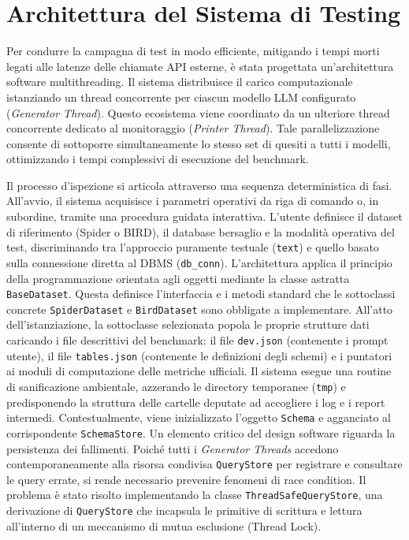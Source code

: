 \section{Architettura del Sistema di
Testing}\label{architettura-del-sistema-di-testing}

Per condurre la campagna di test in modo efficiente, mitigando i tempi
morti legati alle latenze delle chiamate API esterne, è stata progettata
un'architettura software multithreading. Il sistema distribuisce il
carico computazionale istanziando un thread concorrente per ciascun
modello LLM configurato (\emph{Generator Thread}). Questo ecosistema
viene coordinato da un ulteriore thread concorrente dedicato al
monitoraggio (\emph{Printer Thread}). Tale parallelizzazione consente di
sottoporre simultaneamente lo stesso set di quesiti a tutti i modelli,
ottimizzando i tempi complessivi di esecuzione del benchmark.

Il processo d'ispezione si articola attraverso una sequenza
deterministica di fasi. All'avvio, il sistema acquisisce i parametri
operativi da riga di comando o, in subordine, tramite una procedura
guidata interattiva. L'utente definisce il dataset di riferimento
(Spider o BIRD), il database bersaglio e la modalità operativa del test,
discriminando tra l'approccio puramente testuale (\texttt{text}) e
quello basato sulla connessione diretta al DBMS (\texttt{db\_conn}).
L'architettura applica il principio della programmazione orientata agli
oggetti mediante la classe astratta \texttt{BaseDataset}. Questa
definisce l'interfaccia e i metodi standard che le sottoclassi concrete
\texttt{SpiderDataset} e \texttt{BirdDataset} sono obbligate a
implementare. All'atto dell'istanziazione, la sottoclasse selezionata
popola le proprie strutture dati caricando i file descrittivi del
benchmark: il file \texttt{dev.json} (contenente i prompt utente), il
file \texttt{tables.json} (contenente le definizioni degli schemi) e i
puntatori ai moduli di computazione delle metriche ufficiali. Il sistema
esegue una routine di sanificazione ambientale, azzerando le directory
temporanee (\texttt{tmp}) e predisponendo la struttura delle cartelle
deputate ad accogliere i log e i report intermedi. Contestualmente,
viene inizializzato l'oggetto \texttt{Schema} e agganciato al
corrispondente \texttt{SchemaStore}. Un elemento critico del design
software riguarda la persistenza dei fallimenti. Poiché tutti i
\emph{Generator Threads} accedono contemporaneamente alla risorsa
condivisa \texttt{QueryStore} per registrare e consultare le query
errate, si rende necessario prevenire fenomeni di race condition.
Il problema è stato risolto implementando la classe
\texttt{ThreadSafeQueryStore}, una derivazione di \texttt{QueryStore}
che incapsula le primitive di scrittura e lettura all'interno di un
meccanismo di mutua esclusione (Thread Lock).

